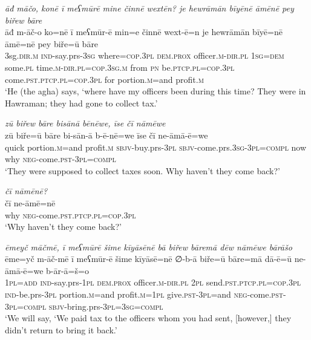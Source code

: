 \ea \label{BP.57}
\textit{āđ māčo, konē ī meʕmūrē mine činnē wextēn? je hewrāmān bīyēnē āmēnē pey biřew bāre} \\ 
\gll āđ m-āč-o ko=nē ī meʕmūr-ē min=e činnē wext-ē=n je hewrāmān bīyē=nē āmē=nē pey biře=ū bāre \\ 
 3sg\textsc{.dir}\textsc{.m} \textsc{ind-}say.prs\textsc{-3sg} where\textsc{=cop}\textsc{.3pl} \textsc{dem.prox} officer\textsc{.m}\textsc{-dir}\textsc{.pl} \textsc{1sg}\textsc{=dem} some\textsc{.pl} time\textsc{.m}\textsc{-dir}\textsc{.pl}\textsc{=cop}\textsc{.3sg}\textsc{.m} from \textsc{pn} be\textsc{.ptcp}\textsc{.pl}\textsc{=cop}\textsc{.3pl} come\textsc{.pst}\textsc{.ptcp}\textsc{.pl}\textsc{=cop}\textsc{.3pl} for portion\textsc{.m}=and profit\textsc{.m} \\ 
\glt `He (the agha) says, ‘where have my officers been during this time? They were in Hawraman; they had gone to collect tax.'
\z 
 
\ea \label{BP.58}
\textit{zū biřew bāre bisānā bēnēwe, īse čī nāmēwe} \\ 
\gll zū biře=ū bāre bi-sān-ā b-ē-nē=we īse čī ne-āmā-ē=we \\ 
 quick portion\textsc{.m}=and profit\textsc{.m} \textsc{sbjv-}buy.prs\textsc{-3pl} \textsc{sbjv-}come.prs\textsc{.3sg}\textsc{-3pl}\textsc{=compl} now why \textsc{neg-}come\textsc{.pst}\textsc{-3pl}\textsc{=compl} \\ 
\glt `They were supposed to collect taxes soon. Why haven’t they come back?'
\z 
 
\ea \label{BP.59}
\textit{čī nāmēnē?} \\ 
\gll čī ne-āmē=nē \\ 
 why \textsc{neg-}come\textsc{.pst}\textsc{.ptcp}\textsc{.pl}\textsc{=cop}\textsc{.3pl} \\ 
\glt `Why haven’t they come back?'
\z 
 
\ea \label{BP.60}
\textit{ēmeyč māčmē, ī meʕmūrē šime kīyāsēnē bā biřew bāremā dēw nāmēwe bārāšo} \\ 
\gll ēme=yč m-āč-mē ī meʕmūr-ē šime kīyāsē=nē ∅-b-ā biře=ū bāre=mā dā-ē=ū ne-āmā-ē=we b-ār-ā=š=o \\ 
 \textsc{1pl}\textsc{=add} \textsc{ind-}say.prs\textsc{-\textsc{1pl}} \textsc{dem.prox} officer\textsc{.m}\textsc{-dir}\textsc{.pl} \textsc{2pl} send\textsc{.pst}\textsc{.ptcp}\textsc{.pl}\textsc{=cop}\textsc{.3pl} \textsc{ind-}be.prs\textsc{-3pl} portion\textsc{.m}=and profit\textsc{.m}\textsc{=\textsc{1pl}} give\textsc{.pst}\textsc{-3pl}=and \textsc{neg-}come\textsc{.pst}\textsc{-3pl}\textsc{=compl} \textsc{sbjv-}bring.prs\textsc{-3pl}\textsc{=3sg}\textsc{=compl} \\ 
\glt `We will say, ‘We paid tax to the officers whom you had sent, [however,] they didn’t return to bring it back.'
\z 
 
